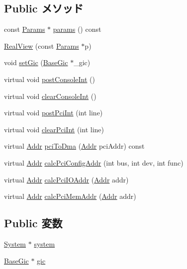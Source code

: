 \subsection*{Public メソッド}
\begin{DoxyCompactItemize}
\item 
const \hyperlink{classRealView_aa902b300d4e5553ea4f127d69fc0fa3a}{Params} $\ast$ \hyperlink{classRealView_acd3c3feb78ae7a8f88fe0f110a718dff}{params} () const 
\item 
\hyperlink{classRealView_a6a5205c4e13fbe18abbcd12f6eea2c66}{RealView} (const \hyperlink{classRealView_aa902b300d4e5553ea4f127d69fc0fa3a}{Params} $\ast$p)
\item 
void \hyperlink{classRealView_a266d7fe9183bc5876c86cf4a57820d0e}{setGic} (\hyperlink{classBaseGic}{BaseGic} $\ast$\_\-gic)
\item 
virtual void \hyperlink{classRealView_a5b278cebc0a62bc2195edf27f059ab1a}{postConsoleInt} ()
\item 
virtual void \hyperlink{classRealView_ad38e46034c079c8e765d3ac7eb99337d}{clearConsoleInt} ()
\item 
virtual void \hyperlink{classRealView_a545d1445357706d7259aa73104f44222}{postPciInt} (int line)
\item 
virtual void \hyperlink{classRealView_a0d98ea2b236bb883fa15d63a59a2ec9e}{clearPciInt} (int line)
\item 
virtual \hyperlink{base_2types_8hh_af1bb03d6a4ee096394a6749f0a169232}{Addr} \hyperlink{classRealView_a87078b3d3a28ae134f6736337e90dac3}{pciToDma} (\hyperlink{base_2types_8hh_af1bb03d6a4ee096394a6749f0a169232}{Addr} pciAddr) const 
\item 
virtual \hyperlink{base_2types_8hh_af1bb03d6a4ee096394a6749f0a169232}{Addr} \hyperlink{classRealView_a5b8797a83289cb5fd895c9a5dc7eae6f}{calcPciConfigAddr} (int bus, int dev, int func)
\item 
virtual \hyperlink{base_2types_8hh_af1bb03d6a4ee096394a6749f0a169232}{Addr} \hyperlink{classRealView_a83afd16479598cfaeb035fd30eeedd8b}{calcPciIOAddr} (\hyperlink{base_2types_8hh_af1bb03d6a4ee096394a6749f0a169232}{Addr} addr)
\item 
virtual \hyperlink{base_2types_8hh_af1bb03d6a4ee096394a6749f0a169232}{Addr} \hyperlink{classRealView_aa2acd9bf04ba56b380e7812ce29971b5}{calcPciMemAddr} (\hyperlink{base_2types_8hh_af1bb03d6a4ee096394a6749f0a169232}{Addr} addr)
\end{DoxyCompactItemize}
\subsection*{Public 変数}
\begin{DoxyCompactItemize}
\item 
\hyperlink{classSystem}{System} $\ast$ \hyperlink{classRealView_af27ccd765f13a4b7bd119dc7579e2746}{system}
\item 
\hyperlink{classBaseGic}{BaseGic} $\ast$ \hyperlink{classRealView_a2e2266dca56928f63667e994933169ee}{gic}
\end{DoxyCompactItemize}


